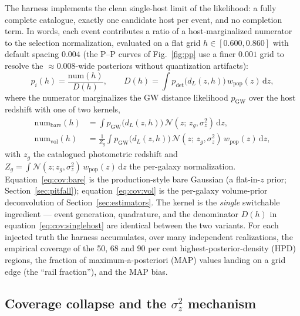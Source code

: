 The harness implements the clean single-host limit of the likelihood: a fully complete catalogue, exactly one candidate host per event, and no completion term. In words, each event contributes a ratio of a host-marginalized numerator to the selection normalization, evaluated on a flat grid $h \in [0.600, 0.860]$ with default spacing $0.004$ (the \mbox{P--P} curves of Fig.~\ref{fig:pp} use a finer $0.001$ grid to resolve the $\approx 0.008$-wide posteriors without quantization artifacts): %
\begin{equation}
  p_i(h) = \frac{\mathrm{num}(h)}{D(h)}, \qquad
  D(h) = \int p_{\mathrm{det}}\!\big(d_L(z,h)\big)\, w_{\mathrm{pop}}(z)\, \mathrm{d}z ,
  \label{eq:cov:singlehost}
\end{equation}
where the numerator marginalizes the GW distance likelihood $p_{\mathrm{GW}}$ over the host redshift with one of two kernels,
\begin{align}
  \mathrm{num}_{\mathrm{bare}}(h) &= \int p_{\mathrm{GW}}\!\big(d_L(z,h)\big)\, \mathcal{N}(z;\, z_g, \sigma_z^2)\, \mathrm{d}z ,
  \label{eq:cov:bare}\\
  \mathrm{num}_{\mathrm{vol}}(h) &= \frac{1}{Z_g} \int p_{\mathrm{GW}}\!\big(d_L(z,h)\big)\, \mathcal{N}(z;\, z_g, \sigma_z^2)\, w_{\mathrm{pop}}(z)\, \mathrm{d}z ,
  \label{eq:cov:vol}
\end{align}
with $z_g$ the catalogued photometric redshift and $Z_g = \int \mathcal{N}(z; z_g, \sigma_z^2)\, w_{\mathrm{pop}}(z)\, \mathrm{d}z$ the per-galaxy normalization. Equation~\eqref{eq:cov:bare} is the production-style bare Gaussian (a flat-in-$z$ prior; Section~\ref{sec:pitfall}); equation~\eqref{eq:cov:vol} is the per-galaxy volume-prior deconvolution of Section~\ref{sec:estimators}. The kernel is the \emph{single} switchable ingredient --- event generation, quadrature, and the denominator $D(h)$ in equation~\eqref{eq:cov:singlehost} are identical between the two variants. For each injected truth the harness accumulates, over many independent realizations, the empirical coverage of the 50, 68 and 90 per cent highest-posterior-density (HPD) regions, the fraction of maximum-a-posteriori (MAP) values landing on a grid edge (the ``rail fraction''), and the MAP bias. %

\subsection{Coverage collapse and the $\sigma_z^2$ mechanism}
\label{sec:coverage:results}

